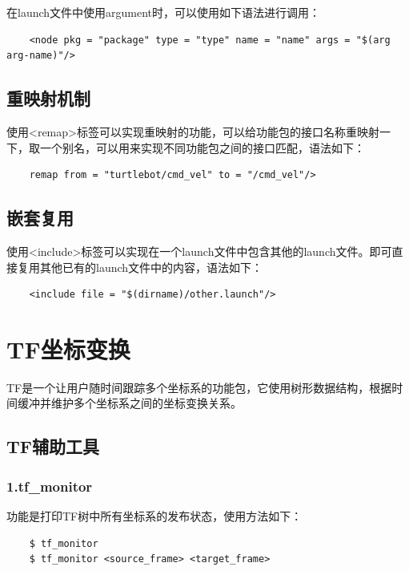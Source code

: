 \documentclass[10pt, oneside]{book}
\begin{document}
在launch文件中使用argument时，可以使用如下语法进行调用：

\begin{verbatim}
    <node pkg = "package" type = "type" name = "name" args = "$(arg arg-name)"/>
\end{verbatim}

\subsection{重映射机制}

使用<remap>标签可以实现重映射的功能，可以给功能包的接口名称重映射一下，取一个别名，可以用来实现不同功能包之间的接口匹配，语法如下：

\begin{verbatim}
    remap from = "turtlebot/cmd_vel" to = "/cmd_vel"/>
\end{verbatim}

\subsection{嵌套复用}

使用<include>标签可以实现在一个launch文件中包含其他的launch文件。即可直接复用其他已有的launch文件中的内容，语法如下：

\begin{verbatim}
    <include file = "$(dirname)/other.launch"/>
\end{verbatim}

\section{TF坐标变换}

TF是一个让用户随时间跟踪多个坐标系的功能包，它使用树形数据结构，根据时间缓冲并维护多个坐标系之间的坐标变换关系。

\subsection{TF辅助工具}

\subsubsection{1.tf\_monitor}

功能是打印TF树中所有坐标系的发布状态，使用方法如下：

\begin{verbatim}
    $ tf_monitor
    $ tf_monitor <source_frame> <target_frame>
\end{verbatim}
\end{document}
